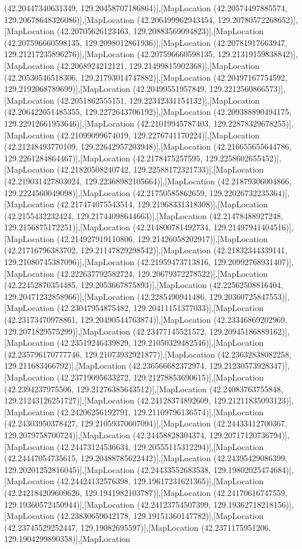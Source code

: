 (42.20447340631349, 129.20458707186864)],[MapLocation (42.20574497885574, 129.20678648326086)],[MapLocation (42.206499962943454, 129.20780572268652)],[MapLocation (42.20705626123463, 129.20883569094823)],[MapLocation (42.207596660598135, 129.2098012861936)],[MapLocation (42.20781917663947, 129.21217235896276)],[MapLocation (42.207596660598135, 129.21319159838842)],[MapLocation (42.2068924212121, 129.21499815902368)],[MapLocation (42.20530546518306, 129.21793014747882)],[MapLocation (42.20497167754592, 129.2192068789699)],[MapLocation (42.20499551957849, 129.2212560866573)],[MapLocation (42.2051862555151, 129.22342331154132)],[MapLocation (42.206422051485355, 129.2272643706192)],[MapLocation (42.209388890494175, 129.22912661953646)],[MapLocation (42.21019945787403, 129.22878329678255)],[MapLocation (42.21099099674019, 129.2276741170224)],[MapLocation (42.21248493770109, 129.22642957203948)],[MapLocation (42.216655655644786, 129.2261284864467)],[MapLocation (42.2178475257595, 129.2258602655452)],[MapLocation (42.21820508240742, 129.22588172321733)],[MapLocation (42.219031427803024, 129.22368982105664)],[MapLocation (42.21879306004866, 129.2224560049098)],[MapLocation (42.21750585862659, 129.22026732235364)],[MapLocation (42.217474075543514, 129.21968331318308)],[MapLocation (42.2155432232424, 129.21744098644663)],[MapLocation (42.21478488927248, 129.2156875172251)],[MapLocation (42.214800781492734, 129.21497941404516)],[MapLocation (42.214927919110806, 129.21426058202917)],[MapLocation (42.21716796383702, 129.21147829298542)],[MapLocation (42.21832344339141, 129.21080745387096)],[MapLocation (42.21959473713816, 129.20992768931407)],[MapLocation (42.222637792582724, 129.20679372278522)],[MapLocation (42.22452870354485, 129.2053667875893)],[MapLocation (42.22562508816404, 129.20471232858966)],[MapLocation (42.2285490941486, 129.20360725847553)],[MapLocation (42.23047954875482, 129.20411151377033)],[MapLocation (42.23173470978861, 129.20490544763874)],[MapLocation (42.23346869202969, 129.2071829575299)],[MapLocation (42.23477145521572, 129.20945186889162)],[MapLocation (42.23519246439829, 129.21050329482546)],[MapLocation (42.235796170777746, 129.21073932921877)],[MapLocation (42.23632838082258, 129.211683466792)],[MapLocation (42.236566682372974, 129.21230573928347)],[MapLocation (42.23719095633272, 129.21278853690615)],[MapLocation (42.2394237975506, 129.21276385643512)],[MapLocation (42.24083763755848, 129.21243126251727)],[MapLocation (42.24128374892609, 129.21211835093123)],[MapLocation (42.24206256192791, 129.21109796136574)],[MapLocation (42.24303950378427, 129.21059370607094)],[MapLocation (42.24433412700367, 129.2079758700724)],[MapLocation (42.24458828304374, 129.20717120736794)],[MapLocation (42.24473124536634, 129.20555115312294)],[MapLocation (42.24447054735615, 129.20488785622442)],[MapLocation (42.24395429086399, 129.20201252816045)],[MapLocation (42.24433552683538, 129.19802025474684)],[MapLocation (42.24424132576398, 129.19617231621365)],[MapLocation (42.242184209609626, 129.1941982103787)],[MapLocation (42.24170616747559, 129.19360572450944)],[MapLocation (42.24123754507399, 129.19362718218156)],[MapLocation (42.23830659042178, 129.19151360147782)],[MapLocation (42.23745529252447, 129.19082695597)],[MapLocation (42.2371175951206, 129.1904299890358)],[MapLocation 